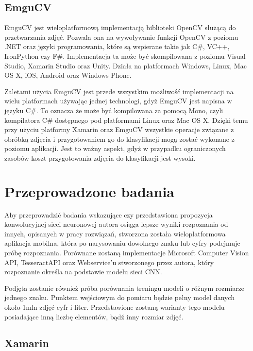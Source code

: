 \documentclass[brudnopis]{xmgr}
\begin{document}
\section{EmguCV}

EmguCV\cite{18} jest wieloplatformową implementacją biblioteki OpenCV służącą do przetwarzania zdjęć. Pozwala ona na wywoływanie funkcji OpenCV z poziomu .NET oraz języki programowania, które są wspierane takie jak C\#, VC++, IronPython czy F\#. Implementacja ta może być skompilowana z poziomu Visual Studio, Xamarin Studio oraz Unity. Działa na platformach Windows, Linux, Mac OS X, iOS, Android oraz Windows Phone.

Zaletami użycia EmguCV jest przede wszystkim możliwość implementacji na wielu platformach używając jednej technologi, gdyż EmguCV jest napisna w języku C\#. To oznacza że może być kompilowana za pomocą Mono, czyli kompilatora C\# dostępnego pod platformami Linux oraz Mac OS X. Dzięki temu przy użyciu platformy Xamarin oraz EmguCV wszystkie operacje związane z obróbką zdjęcia i przygotowaniem go do klasyfikacji mogą zostać wykonane z poziomu aplikacji. Jest to ważny aspekt, gdyż w przypadku ograniczonych zasobów koszt przygotowania zdjęcia do klasyfikacji jest wysoki.

\chapter{Przeprowadzone badania}

Aby przeprowadzić badania wskazujące czy przedstawiona propozycja konwolucyjnej sieci neuronowej autora osiąga lepsze wyniki rozpoznania od innych, opisanych w pracy rozwiązań, stworzona została wieloplatformowa aplikacja mobilna, która po narysowaniu dowolnego znaku lub cyfry podejmuje próbę rozpoznania.
Porównane zostaną implementacje Microsoft Computer Vision API\cite{9}, TesseractAPI\cite{10} oraz Webservice'u\cite{5} stworzonego przez autora, który rozpoznanie określa na podstawie modelu sieci CNN\cite{14}.

Podjęta zostanie również próba porównania treningu modeli o różnym rozmiarze jednego znaku. Punktem wejściowym do pomiaru będzie pełny model danych około 1mln zdjęć cyfr i liter. Przedstawione zostaną warianty tego modelu posiadające inną liczbę elementów, bądź inny rozmiar zdjęć.

\section{Xamarin}
\end{document}
